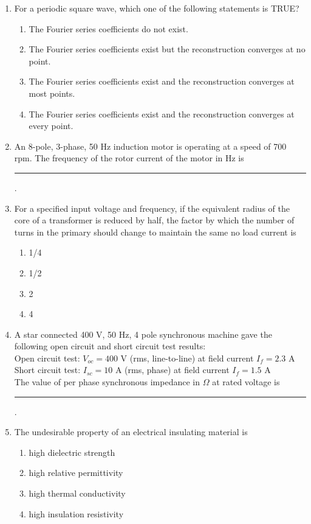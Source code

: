 \documentclass[journal,12pt,onecolumn]{IEEEtran}
\begin{document}
\begin{enumerate}[label=Q\arabic*:, leftmargin=*, itemindent=0pt, start=10]

\item For a periodic square wave, which one of the following statements is TRUE?
\begin{enumerate}[label=(\Alph*)]
    \item The Fourier series coefficients do not exist.
    \item The Fourier series coefficients exist but the reconstruction converges at no point.
    \item The Fourier series coefficients exist and the reconstruction converges at most points.
    \item The Fourier series coefficients exist and the reconstruction converges at every point.
\end{enumerate}

\item An 8-pole, 3-phase, 50 Hz induction motor is operating at a speed of 700 rpm. The frequency of the rotor current of the motor in Hz is \rule{3cm}{0.15mm}.

\item For a specified input voltage and frequency, if the equivalent radius of the core of a transformer is reduced by half, the factor by which the number of turns in the primary should change to maintain the same no load current is
\begin{enumerate}[label=(\Alph*)]
    \item 1/4
    \item 1/2
    \item 2
    \item 4
\end{enumerate}

\item A star connected 400 V, 50 Hz, 4 pole synchronous machine gave the following open circuit and short circuit test results:\\
Open circuit test: $V_{oc} = 400$ V (rms, line-to-line) at field current $I_f = 2.3$ A\\
Short circuit test: $I_{sc} = 10$ A (rms, phase) at field current $I_f = 1.5$ A\\
The value of per phase synchronous impedance in $\Omega$ at rated voltage is \rule{3cm}{0.15mm}.

\item The undesirable property of an electrical insulating material is
\begin{enumerate}[label=(\Alph*)]
    \item high dielectric strength
    \item high relative permittivity
    \item high thermal conductivity
    \item high insulation resistivity
\end{enumerate}


\end{enumerate}
\end{document}
